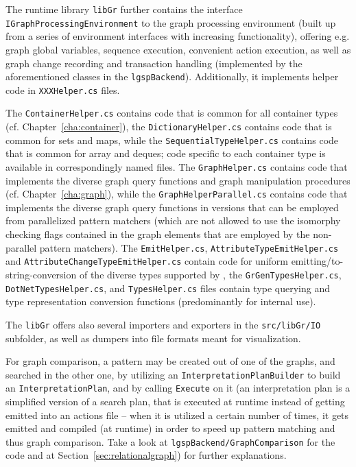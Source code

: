 The runtime library \texttt{libGr} further contains the interface \texttt{IGraphProcessingEnvironment} to the graph processing environment (built up from a series of environment interfaces with increasing functionality), offering e.g. graph global variables, sequence execution, convenient action execution, as well as graph change recording and transaction handling (implemented by the aforementioned classes in the \texttt{lgspBackend}).
Additionally, it implements helper code in \texttt{XXXHelper.cs} files.

The \texttt{ContainerHelper.cs} contains code that is common for all container types (cf. Chapter~\ref{cha:container}), the \texttt{DictionaryHelper.cs} contains code that is common for sets and maps, while the \texttt{SequentialTypeHelper.cs} contains code that is common for array and deques; code specific to each container type is available in correspondingly named files.
The \texttt{GraphHelper.cs} contains code that implements the diverse graph query functions and graph manipulation procedures (cf. Chapter~\ref{cha:graph}), while the \texttt{GraphHelperParallel.cs} contains code that implements the diverse graph query functions in versions that can be employed from parallelized pattern matchers (which are not allowed to use the isomorphy checking flags contained in the graph elements that are employed by the non-parallel pattern matchers).
The \texttt{Emit\-Helper.cs}, \texttt{Attribute\-Type\-Emit\-Helper.cs} and \texttt{Attribute\-Change\-Type\-Emit\-Helper.cs} contain code for uniform emitting/to-string-conversion of the diverse types supported by \GrG, the \texttt{GrGen\-Types\-Helper.cs}, \texttt{Dot\-Net\-Types\-Helper.cs}, and \texttt{Types\-Helper.cs} files contain type querying and type representation conversion functions (predominantly for internal use).

The \texttt{libGr} offers also several importers and exporters in the \texttt{src/libGr/IO} subfolder, as well as dumpers into file formats meant for visualization.

For graph comparison, a pattern may be created out of one of the graphs, and searched in the other one, by utilizing an \texttt{Interpretation\-Plan\-Builder} to build an \texttt{Interpretation\-Plan}, and by calling \texttt{Execute} on it (an interpretation plan is a simplified version of a search plan, that is executed at runtime instead of getting emitted into an actions file -- when it is utilized a certain number of times, it gets emitted and compiled (at runtime) in order to speed up pattern matching and thus graph comparison.
Take a look at \texttt{lgspBackend/Graph\-Comparison} for the code and at Section~\ref{sec:relationalgraph}) for further explanations.

